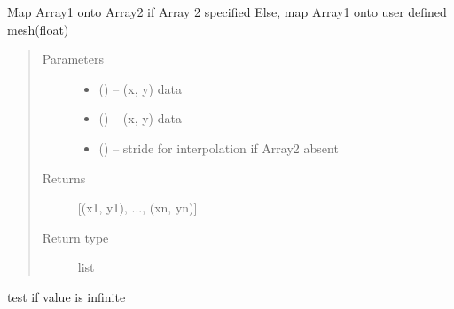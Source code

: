 \documentclass[letterpaper,10pt,english]{sphinxmanual}
\begin{document}

\begin{fulllineitems}
\label{\detokenize{rst/utilities:mstack.utilities.interpolate_data}}
Map Array1 onto Array2 if Array 2 specified
Else, map Array1 onto user defined mesh(float)
\begin{quote}\begin{description}
\item[{Parameters}] \leavevmode\begin{itemize}
\item {} 
 (\sphinxstyleliteralemphasis{, }) -- (x, y) data

\item {} 
 (\sphinxstyleliteralemphasis{, }) -- (x, y) data

\item {} 
 () -- stride for interpolation if Array2 absent

\end{itemize}

\item[{Returns}] \leavevmode
{[}(x1, y1), ..., (xn, yn){]}

\item[{Return type}] \leavevmode
list

\end{description}\end{quote}

\end{fulllineitems}


\begin{fulllineitems}
\label{\detokenize{rst/utilities:mstack.utilities.isfinite}}
test if value is infinite

\end{fulllineitems}

\end{document}
